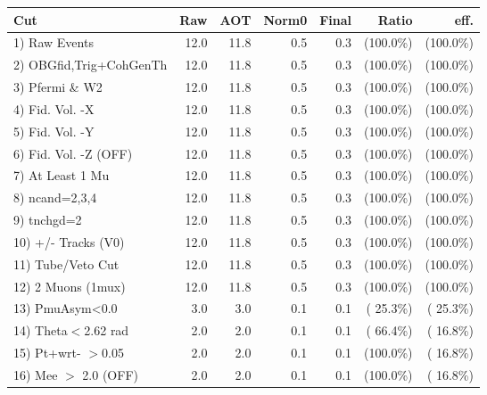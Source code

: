  \begin{table}[h!]\centering
 \begin{tabular}{||l||r|r|r|r|r|r||}
 \hline
 \hline
 Cut & Raw & AOT & Norm0 & Final & Ratio & eff.       \\
 \hline
  1) Raw Events           &         12.0 &         11.8 &          0.5 &          0.3 & (100.0\%) & (100.0\%) \\
  2) OBGfid,Trig+CohGenTh &         12.0 &         11.8 &          0.5 &          0.3 & (100.0\%) & (100.0\%) \\
  3) Pfermi \& W2         &         12.0 &         11.8 &          0.5 &          0.3 & (100.0\%) & (100.0\%) \\
  4) Fid. Vol. -X         &         12.0 &         11.8 &          0.5 &          0.3 & (100.0\%) & (100.0\%) \\
  5) Fid. Vol. -Y         &         12.0 &         11.8 &          0.5 &          0.3 & (100.0\%) & (100.0\%) \\
  6) Fid. Vol. -Z (OFF)   &         12.0 &         11.8 &          0.5 &          0.3 & (100.0\%) & (100.0\%) \\
  7) At Least 1 Mu        &         12.0 &         11.8 &          0.5 &          0.3 & (100.0\%) & (100.0\%) \\
  8) ncand=2,3,4          &         12.0 &         11.8 &          0.5 &          0.3 & (100.0\%) & (100.0\%) \\
  9) tnchgd=2             &         12.0 &         11.8 &          0.5 &          0.3 & (100.0\%) & (100.0\%) \\
 10) +/- Tracks (V0)      &         12.0 &         11.8 &          0.5 &          0.3 & (100.0\%) & (100.0\%) \\
 11) Tube/Veto Cut        &         12.0 &         11.8 &          0.5 &          0.3 & (100.0\%) & (100.0\%) \\
 12) 2 Muons (1mux)       &         12.0 &         11.8 &          0.5 &          0.3 & (100.0\%) & (100.0\%) \\
 13) PmuAsym<0.0          &          3.0 &          3.0 &          0.1 &          0.1 & ( 25.3\%) & ( 25.3\%) \\
 14) Theta$<$2.62 rad     &          2.0 &          2.0 &          0.1 &          0.1 & ( 66.4\%) & ( 16.8\%) \\
 15) Pt+wrt- $>$0.05      &          2.0 &          2.0 &          0.1 &          0.1 & (100.0\%) & ( 16.8\%) \\
 16) Mee $>$ 2.0  (OFF)   &          2.0 &          2.0 &          0.1 &          0.1 & (100.0\%) & ( 16.8\%) \\

\end{tabular}
\end{table}

